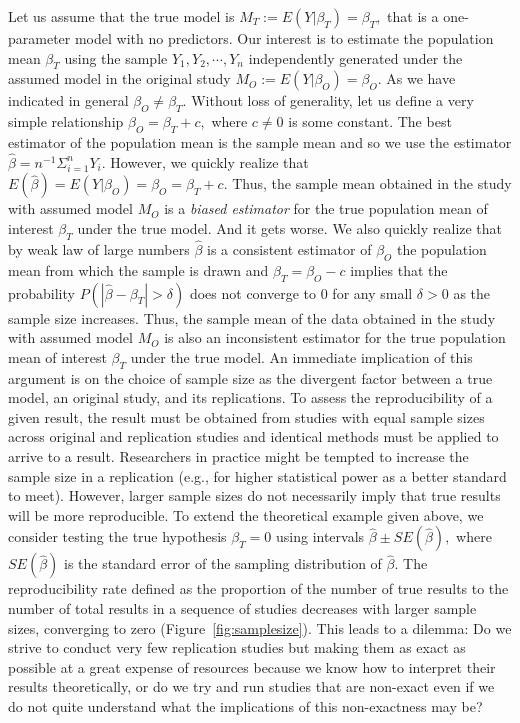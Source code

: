 \documentclass[meta,authordate,issue]{jote-new-article}
\newcounter{result}
\begin{document}
Let us assume that the true model is $M_T:=E(Y|\beta_{T})=\beta_{T},$ that is a one-parameter model with no predictors. Our interest is to estimate the population mean $\beta_{T}$ using the sample $Y_1,Y_2,\cdots, Y_n$ independently generated under the assumed model in the original study $M_O:=E(Y|\beta_{O})=\beta_{O}.$ As we have indicated in general $\beta_{O} \neq \beta_{T}.$ Without loss of generality, let us define a very simple relationship $\beta_{O}=\beta_{T}+c,$ where $c\neq 0$ is some constant. The best estimator of the population mean is the sample mean and so we use the estimator $\hat{\beta}=n^{-1}\Sigma_{i=1}^{n}Y_i.$ However, we quickly realize that $E(\hat{\beta})=E(Y|\beta_{O})=\beta_{O}=\beta_{T}+c.$ Thus, the sample mean obtained in the study with assumed model $M_O$ is a {\em biased estimator} for the true population mean of interest $\beta_{T}$ under the true model. And it gets worse. We also quickly realize that by weak law of large numbers $\hat{\beta}$ is a consistent estimator of $\beta_{O}$ the population mean from which the sample is drawn and  $\beta_{T}=\beta_{O}-c$ implies that the probability $P(|\hat{\beta}-\beta_{T}|>\delta)$ does not converge to $0$ for any small $\delta>0$ as the sample size increases. Thus, the sample mean of the data obtained in the study with assumed model $M_O$ is also an inconsistent estimator for the true population mean of interest $\beta_{T}$ under the true model.
%
An immediate implication of this argument is on the choice of sample size as the divergent factor between a true model, an original study, and its replications. To assess the reproducibility of a given result, the result must be obtained from studies with equal sample sizes across original and replication studies and identical methods must be applied to arrive to a result. Researchers in practice might be tempted to increase the sample size in a replication (e.g., for higher statistical power as a better standard to meet). However, larger sample sizes do not necessarily imply that true results will be more reproducible. To extend the theoretical example given above, we consider testing the true hypothesis $\beta_{T} = 0$ using intervals $\hat{\beta} \pm SE(\hat{\beta}),$ where ${SE}(\hat{\beta})$ is the standard error of the sampling distribution of $\hat{\beta}$. The reproducibility rate defined as the proportion of the number of true results to the number of total results in a sequence of studies decreases with larger sample sizes, converging to zero (Figure~\ref{fig:samplesize}). This leads to a dilemma: Do we strive to conduct very few replication studies but making them as exact as possible at a great expense of resources because we know how to interpret their results theoretically, or do we try and run studies that are non-exact even if we do not quite understand what the implications of this non-exactness may be?
\end{document}
